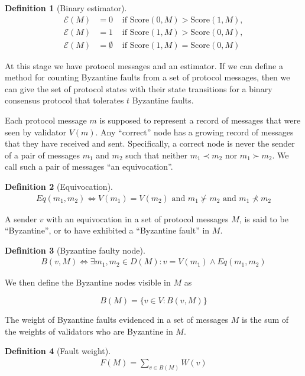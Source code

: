 \documentclass{article}
\theoremstyle{definition}
\newtheorem{defn}{Definition}[section]
\begin{document}
\begin{defn}[Binary estimator]
\begin{align}
  \mathcal{E}(M) &= 0 &\text{ if } \text{Score}(0, M) > \text{Score}(1, M), \\
  \mathcal{E}(M) &= 1 &\text{ if } \text{Score}(1, M) > \text{Score}(0, M), \\
  \mathcal{E}(M) &= \emptyset &\text{ if } \text{Score}(1, M) = \text{Score}(0, M)
\end{align}
\end{defn}

At this stage we have protocol messages and an estimator. If we can define a method for counting Byzantine faults from a set of protocol messages, then we can give the set of protocol states with their state transitions for a binary consensus protocol that tolerates $t$ Byzantine faults.

Each protocol message $m$ is supposed to represent a record of messages that were seen by validator $V(m)$. Any ``correct'' node has a growing record of messages that they have received and sent. Specifically, a correct node is never the sender of a pair of messages $m_1$ and $m_2$ such that neither $m_1 \prec m_2$ nor $m_1 \succ m_2$. We call such a pair of messages ``an equivocation''.


\begin{defn}[Equivocation]
\begin{align}
Eq(m_1, m_2) \iff V(m_1) = V(m_2) \text{ and } m_1 \nsucc m_2 \text{ and } m_1 \nprec m_2
\end{align}
\end{defn}

A sender $v$ with an equivocation in a set of protocol messages $M$, is said to be ``Byzantine'', or to have exhibited a ``Byzantine fault'' in $M$.

\begin{defn}[Byzantine faulty node]
\begin{align}
B(v,M) \iff \exists m_1, m_2 \in D(M) : v = V(m_1) \land Eq(m_1, m_2)
\end{align}
\end{defn}

We then define the Byzantine nodes visible in $M$ as

$$
B(M) = \{v \in V: B(v,M)\}
$$

The weight of Byzantine faults evidenced in a set of messages $M$ is the sum of the weights of validators who are Byzantine in $M$.

\begin{defn}[Fault weight]
\begin{align}
F(M) = \sum_{v \in B(M)} W(v)
\end{align}
\end{defn}
\end{document}
